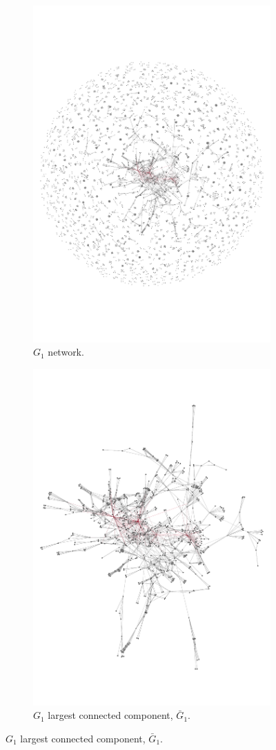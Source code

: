 \documentclass{article}
\theoremstyle{definition}
\begin{document}
\begin{figure}[!hbtp]
    \begin{subfigure}{.45\textwidth}\centering
        \includegraphics[width=.54\textwidth]{./assets/images/pd_network.pdf}
        \caption{\(G_1\) network.}\label{fig:g_one_network}
    \end{subfigure}
    \begin{subfigure}{.45\textwidth}\centering
        \includegraphics[width=.54\textwidth]{./assets/images/pd_network_cluster.pdf}
        \caption{\(G_1\) largest connected component, \(\bar{G}_{1}\).}\label{fig:g_one_cluster}
     \end{subfigure}
     

\end{figure}
\end{document}
